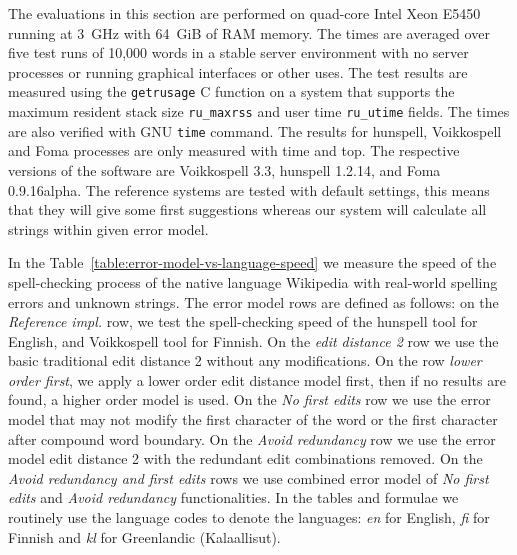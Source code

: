 \documentclass[11pt]{article}
\begin{document}
The evaluations in this section are performed on quad-core Intel Xeon E5450
running at 3~GHz with 64~GiB of RAM memory. The times are averaged over five
test runs of 10,000 words in a stable server environment with no server processes
or running graphical interfaces or other uses. The test results are measured using the
\texttt{getrusage} C function on a system that supports the maximum resident
stack size \texttt{ru\_maxrss} and user time \texttt{ru\_utime} fields. The
times are also verified with GNU \texttt{time} command. The results for
hunspell, Voikkospell and Foma processes are only measured with time and top.
The respective versions of the software are Voikkospell 3.3, hunspell
1.2.14, and Foma 0.9.16alpha. The reference systems are tested with default
settings, this means that they will give some first suggestions whereas
our system will calculate all strings within given error model.

In the Table~\ref{table:error-model-vs-language-speed} we measure the speed of
the spell-checking process of the native language Wikipedia with real-world
spelling errors and unknown strings. The error model rows are defined as
follows: on the \emph{Reference impl.} row, we test the spell-checking speed of
the hunspell tool for English, and Voikkospell tool for Finnish. On the
\emph{edit distance 2} row we use the basic traditional edit distance 2 without
any modifications. On the row \emph{lower order first}, we apply a
lower order edit distance model first, then if no results are found,
a higher order model is used. On the \emph{No first edits} row we
use the error model that may not modify the first character of the word or the
first character after compound word boundary. On the \emph{Avoid redundancy}
row we use the error model edit distance 2 with the redundant edit combinations
removed. On the \emph{Avoid redundancy and first edits} rows we use combined
error model of \emph{No first edits} and \emph{Avoid redundancy}
functionalities.  In the tables and formulae we routinely use the language
codes to denote the languages: \emph{en} for English, \emph{fi} for Finnish and
\emph{kl} for Greenlandic (Kalaallisut). 
\end{document}
